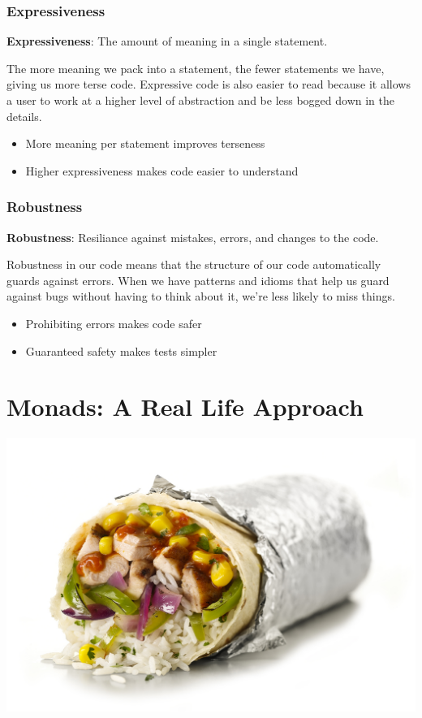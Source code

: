 \documentclass{beamer}
\begin{document}
\begin{frame}
  \frametitle{Expressiveness}
  {\bf Expressiveness}: The amount of meaning in a single statement.
  \par\pause
  The more meaning we pack into a statement, the fewer statements we
  have, giving us more terse code.  Expressive code is also easier to
  read because it allows a user to work at a higher level of
  abstraction and be less bogged down in the details.
  \vfill
  \begin{itemize}
  \item More meaning per statement improves terseness
  \item Higher expressiveness makes code easier to understand
  \end{itemize}
\end{frame}

\begin{frame}
  \frametitle{Robustness}
  {\bf Robustness}: Resiliance against mistakes, errors, and changes to the code.
  \par\pause
  Robustness in our code means that the structure of our code
  automatically guards against errors.  When we have patterns and
  idioms that help us guard against bugs without having to think about
  it, we're less likely to miss things.
  \vfill
  \begin{itemize}
  \item Prohibiting errors makes code safer
  \item Guaranteed safety makes tests simpler
  \end{itemize}
\end{frame}

\section{Monads: A Real Life Approach}
\begin{frame}
  \begin{center}
    \includegraphics[height=.85\paperheight]{images/small/burrito}
  \end{center}
\end{frame}
\end{document}
